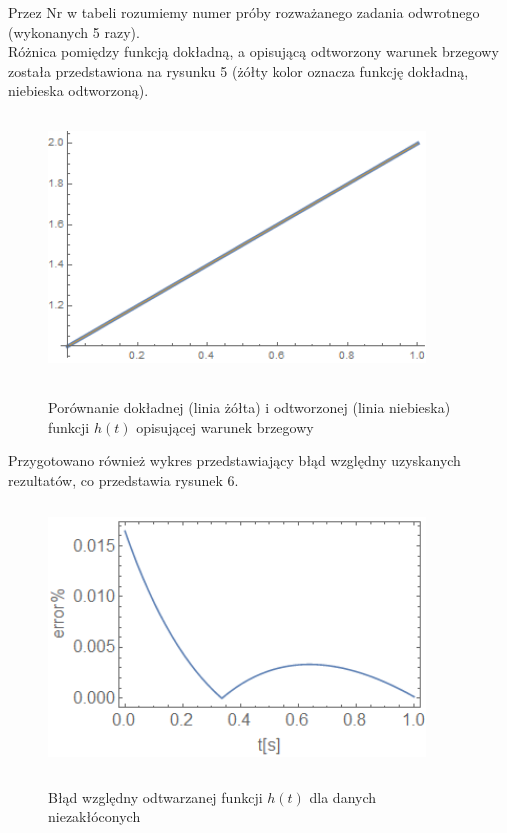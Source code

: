 \documentclass[twoside]{projektInzynierskiMS1}
\begin{document}
\noindent Przez Nr w tabeli rozumiemy numer próby rozważanego zadania odwrotnego (wykonanych 5 razy). \\


Różnica pomiędzy funkcją dokładną, a opisującą odtworzony warunek brzegowy została przedstawiona na rysunku 5 (żółty kolor oznacza funkcję dokładną, niebieska odtworzoną).

\begin{figure}[H]
\begin{center}
		\includegraphics[height=7cm, width=10cm]{pics/0reconstruction.png}\\
	\caption{Porównanie dokładnej (linia żółta) i odtworzonej (linia niebieska) funkcji $h(t)$ opisującej warunek brzegowy}
\end{center}
\end{figure}

Przygotowano również wykres przedstawiający błąd względny uzyskanych rezultatów, co przedstawia rysunek 6. \\

\begin{figure}[H]
\begin{center}
		\includegraphics[height=7cm, width=10cm]{pics/0abs.png}\\
	\caption{Błąd względny odtwarzanej funkcji $h(t)$ dla danych niezakłóconych}
\end{center}
\end{figure}
\end{document}
